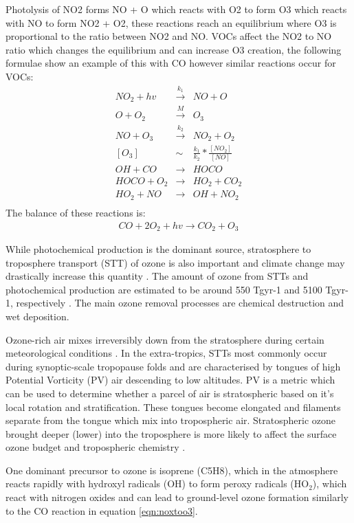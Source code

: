 Photolysis of NO2 forms NO + O which reacts with O2 to form O3 which reacts with NO to form NO2 + O2, these reactions reach an equilibrium where O3 is proportional to the ratio between NO2 and NO.
VOCs affect the NO2 to NO ratio which changes the equilibrium and can increase O3 creation, the following formulae show an example of this with CO however similar reactions occur for VOCs:
\begin{eqnarray}
\label{eqn:noxtoo3}
NO_2 + hv &\overset{k_1}{\rightarrow}& NO + O \\
O + O_2 &\overset{M}{\rightarrow}& O_3 \\
NO + O_3 &\overset{k_2}{\rightarrow}& NO_2 + O_2 \\
[O_3] &\sim& \frac{k_1}{k_2} * \frac{[NO_2]}{[NO]} \\
OH + CO &{\rightarrow}& HOCO \\
HOCO + O_2 &{\rightarrow}& HO_2 + CO_2 \\
HO_2 + NO &{\rightarrow}& OH + NO_2 \\
\end{eqnarray}
The balance of these reactions is:
\begin{eqnarray*} CO + 2O_2 + hv {\rightarrow} CO_2 + O_3 \end{eqnarray*}

While photochemical production is the dominant source, stratosphere to troposphere transport (STT) of ozone is also important and climate change may drastically increase this quantity \cite{Hegglin_2009}.
The amount of ozone from STTs and photochemical production are estimated to be around 550 Tgyr-1 and 5100 Tgyr-1, respectively \cite{Stevenson_2006}. 
The main ozone removal processes are chemical destruction and wet deposition.

Ozone-rich air mixes irreversibly down from the stratosphere during certain meteorological conditions \citep{Sprenger2003,Mihalikova2012}.
In the extra-tropics, STTs most commonly occur during synoptic-scale tropopause folds \citep{Sprenger2003} and are characterised by tongues of high Potential Vorticity (PV) air descending to low altitudes.
PV is a metric which can be used to determine whether a parcel of air is stratospheric based on it's local rotation and stratification.
These tongues become elongated and filaments separate from the tongue which mix into tropospheric air.
Stratospheric ozone brought deeper (lower) into the troposphere is more likely to affect the surface ozone budget and tropospheric chemistry \citep{Zanis2003,Langford_2009}.

One dominant precursor to ozone is isoprene (C5H8), which in the atmosphere reacts rapidly with hydroxyl radicals (OH) to form peroxy radicals (HO$_2$), which react with nitrogen oxides and can lead to ground-level ozone formation similarly to the CO reaction in equation \ref{eqn:noxtoo3}.

  
